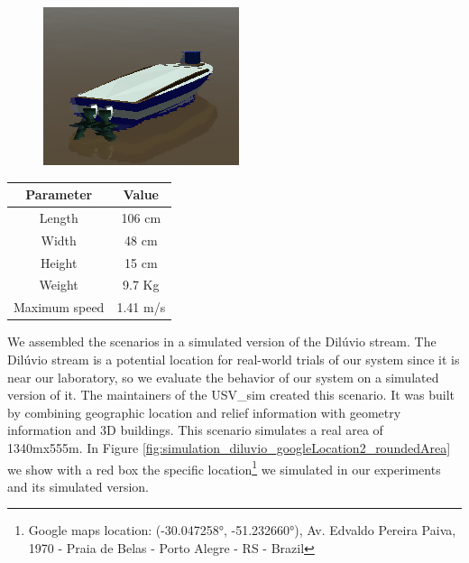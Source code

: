     \begin{minipage}{\textwidth}
        \begin{minipage}[b]{0.35\textwidth}
        \centering
        \begin{figure}[H]
            \centering
            \includegraphics[scale=0.75]{figs/Chap5/diffboat.png}
        \end{figure}
        \label{fig:diffboat}
        \end{minipage}
        \begin{minipage}[b]{0.5\textwidth}
        \centering
            \begin{tabular}{cc}
                \toprule
                    \textbf{Parameter}       & \textbf{Value}       \\
                \midrule
                    Length          & 106 cm      \\
                    Width           & 48 cm       \\
                    Height          & 15 cm       \\
                    Weight          & 9.7 Kg      \\
                    Maximum speed   & 1.41 m/s    \\ 
                \bottomrule
            \end{tabular}
        \label{tab:diffboat_specs}
        \end{minipage}
    \end{minipage}
    
    \vskip 1cm

    We assembled the scenarios in a simulated version of the Dilúvio stream. The Dilúvio stream is a potential location for real-world trials of our system since it is near our laboratory, so we evaluate the behavior of our system on a simulated version of it. The maintainers of the USV\_sim created this scenario. It was built by combining geographic location and relief information with geometry information and 3D buildings. This scenario simulates a real area of 1340mx555m. In Figure \ref{fig:simulation_diluvio_googleLocation2_roundedArea} we show with a red box the specific location\footnote{Google maps location: (-30.047258°, -51.232660°), Av. Edvaldo Pereira Paiva, 1970 - Praia de Belas - Porto Alegre - RS - Brazil} we simulated in our experiments and its simulated version.
     
